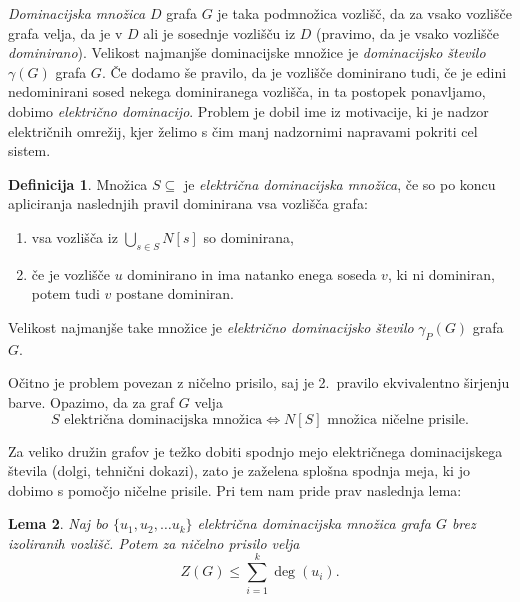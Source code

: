 \documentclass[12pt,a4paper,twoside]{article}
\theoremstyle{definition} %
\newtheorem{definicija}{Definicija}[section]
\theoremstyle{plain} %
\newtheorem{lema}[definicija]{Lema}
\numberwithin{equation}{section}  %
\begin{document}
\emph{Dominacijska množica} $D$ grafa $G$ je taka podmnožica vozlišč, da za vsako vozlišče grafa velja, da je v $D$ ali je sosednje vozlišču iz $D$ (pravimo, da je vsako vozlišče \emph{dominirano}). Velikost najmanjše dominacijske množice je \emph{dominacijsko število} $\gamma(G)$ grafa $G$.
Če dodamo še pravilo, da je vozlišče dominirano tudi, če je edini nedominirani sosed nekega dominiranega vozlišča, in ta postopek ponavljamo, dobimo \emph{električno dominacijo}. Problem je dobil ime iz motivacije, ki je nadzor električnih omrežij, kjer želimo s čim manj nadzornimi napravami pokriti cel sistem.
\begin{definicija}
    Množica $S \subseteq$ je \emph{električna dominacijska množica}, če so po koncu apliciranja naslednjih pravil dominirana vsa vozlišča grafa:
    \begin{enumerate}
        \item vsa vozlišča iz $\bigcup_{s \in S} N[s]$ so dominirana,
        \item če je vozlišče $u$ dominirano in ima natanko enega soseda $v$, ki ni dominiran, potem tudi $v$ postane dominiran.
    \end{enumerate}
    Velikost najmanjše take množice je \emph{električno dominacijsko število} $\gamma_P(G)$ grafa $G$.
\end{definicija}
Očitno je problem povezan z ničelno prisilo, saj je 2.~pravilo ekvivalentno širjenju barve. Opazimo, da za graf $G$ velja
\[ S \text{ električna dominacijska množica} \iff N[S] \text{ množica ničelne prisile.} \]

Za veliko družin grafov je težko dobiti spodnjo mejo električnega dominacijskega števila (dolgi, tehnični dokazi), zato je zaželena splošna spodnja meja, ki jo dobimo s pomočjo ničelne prisile. Pri tem nam pride prav naslednja lema:

\begin{lema}{{\cite[lema 2]{dean2011power}}}
    \label{lem:dom-zf-stopnje}
    Naj bo $\{u_1, u_2, \ldots u_k \}$ električna dominacijska množica grafa $G$ brez izoliranih vozlišč. Potem za ničelno prisilo velja
    \[ Z(G) \leq \sum_{i=1}^{k} \deg(u_i). \]
\end{lema}
\end{document}
